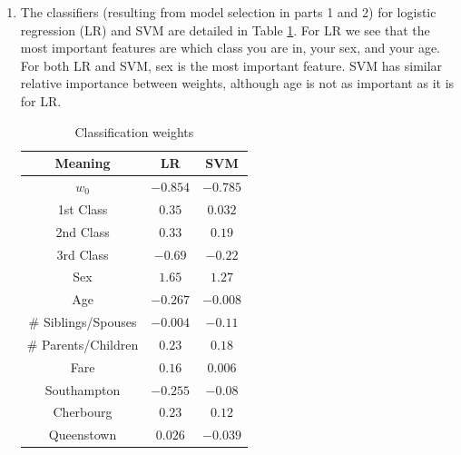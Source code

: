 \documentclass[10pt]{article}
\begin{document}
\begin{enumerate}
 \item The classifiers (resulting from model selection in parts 1 and 2) for logistic regression (LR) and SVM are detailed in Table \ref{weights}. For LR we see that the most important features are which class you are in, your sex, and your age. For both LR and SVM, sex is the most important feature.  SVM has similar relative importance between weights, although age is not as important as it is for LR.
 \begin{table}[H]
 \begin{tabular}{|c|c|c|}
 \hline
 Meaning & LR & SVM \\ \hline
 $w_0$ & $-0.854$ & $-0.785$ \\ \hline
 1st Class & $0.35$ & $0.032$\\ \hline
 2nd Class & $0.33$ & $0.19$\\ \hline
 3rd Class & $-0.69$ & $-0.22$\\ \hline
 Sex  & $1.65$ & $1.27$\\ \hline
 Age & $-0.267$ & $-0.008$\\ \hline
 \# Siblings/Spouses & $-0.004$ & $-0.11$ \\ \hline
 \# Parents/Children & $0.23$ & $0.18$\\ \hline
 Fare & $0.16$ & $0.006$\\ \hline
 Southampton & $-0.255$ & $-0.08$ \\ \hline
 Cherbourg & $0.23$ & $0.12$\\ \hline
 Queenstown & $0.026$ & $-0.039$\\ \hline
 \end{tabular}
 \caption{Classification weights}
 \label{weights}
 \end{table}


\end{enumerate}
\end{document}
